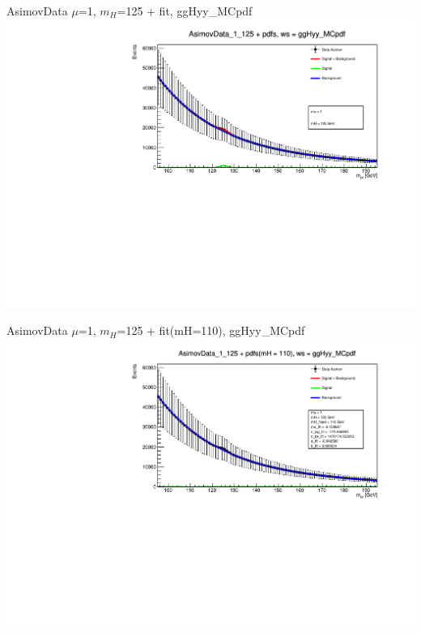\documentclass[10pt,UKenglish, leqno, xcolor = dvipsnames]{beamer}
\begin{document}
		\begin{frame}{AsimovData $\mu$=1, $m_H$=125 + fit, ggHyy\_MCpdf}
			\vfill
			\includegraphics[width=1.\textwidth]{../images/AsimovData_1_125_fit_ggHyy_MCpdf.pdf}
			\vfill
		\end{frame}
	
		\begin{frame}{AsimovData $\mu$=1, $m_H$=125 + fit(mH=110), ggHyy\_MCpdf}
			\vfill
			\includegraphics[width=1.\textwidth]{../images/AsimovData_1_125_check_ggHyy_MCpdf.pdf}
			\vfill
		\end{frame}
	
\end{document}
